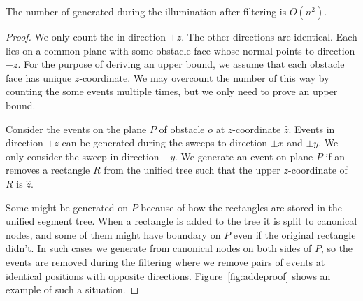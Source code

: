 \documentclass[english,gradu]{tktltiki2018}
\begin{document}
\begin{lem}\label{lem:adde3}The number of \addEs generated during the illumination after filtering is $O(n^2)$.\end{lem}
\begin{proof}
We only count the \addEs in direction $+z$.
The other directions are identical.
Each \addE lies on a common plane with some obstacle face whose normal points to direction $-z$.
For the purpose of deriving an upper bound, we assume that each obstacle face has unique $z$-coordinate.
We may overcount the number of \addEs this way by counting the some events multiple times, but we only need to prove an upper bound.

Consider the events on the plane $P$ of obstacle $o$ at $z$-coordinate $\hat{z}$.
Events in direction $+z$ can be generated during the sweeps to direction $\pm x$ and $\pm y$.
We only consider the sweep in direction $+y$.
We generate an event on plane $P$ if an \obsE removes a rectangle $R$ from the unified tree such that the upper $z$-coordinate of $R$ is $\hat{z}$.

Some \addEs might be generated on $P$ because of how the rectangles are stored in the unified segment tree.
When a rectangle is added to the tree it is split to canonical nodes, and some of them might have boundary on $P$ even if the original rectangle didn't.
In such cases we generate \addEs from canonical nodes on both sides of $P$, so the events are removed during the filtering where we remove pairs of events at identical positions with opposite directions.
Figure~\ref{fig:addeproof} shows an example of such a situation.


\end{proof}
\end{document}
